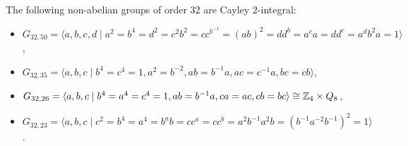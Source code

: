 \documentclass[10pt,a4paper]{amsart}
\begin{document}
\begin{lem}\label{32yes}
	The following non-abelian groups of order 32 are Cayley $2$-integral:
	\begin{itemize}
		\item[(1)] $G_{32,50}=\langle a,b,c,d\mid a^2=b^4=d^2=c^2b^2=cc^{b^{-1}}=(ab)^2=dd^b=a^ca=dd^c=a^db^2a=1\rangle$,
		\item[(2)] $G_{32,35}=\langle a,b,c\mid b^4=c^4=1, a^2=b^{-2}, ab=b^{-1}a,ac=c^{-1}a,bc=cb\rangle$,
		\item[(3)] $G_{32,26}=\langle a,b,c\mid  b^4=a^4=c^4=1, ab=b^{-1}a, ca=ac, cb=bc\rangle\cong\Bbb Z_4\times Q_8$,
		\item[(4)] $G_{32,23}=\langle a,b,c\mid c^2=b^4=a^4=b^ab=cc^a= cc^b=a^2b^{-1}a^2b=(b^{-1}a^{-2}b^{-1})^2=1 \rangle$.
	\end{itemize}
\end{lem}
\end{document}

